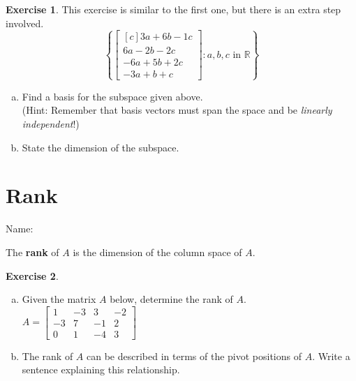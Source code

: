 \documentclass[10pt]{book}
\newcommand{\boxcolor}{gray!30}
\newenvironment{boxdef}{\begin{mdframed}[backgroundcolor=\boxcolor,linewidth=0pt,nobreak=true]}{\end{mdframed}}
\theoremstyle{definition}
\newtheorem{exercise}{Exercise}[section]
\newcommand{\name}[1][2.5in]{\vspace{-2.3em}\hfill Name: \underline{\hspace{#1}}}
\newcommand{\R}{\mathbb{R}}
\begin{document}
\begin{exercise} %
	This exercise is similar to the first one, but there is an extra step involved.
	$$\left\{ \begin{bmatrix}[c] 3a+6b-1c \\ 6a-2b-2c \\ -6a+5b+2c \\ -3a+b+c \end{bmatrix} : a,b,c \text{ in } \R \right\}$$
	\begin{enumerate}[(a)]
		\item Find a basis for the subspace given above. \\
		(Hint: Remember that basis vectors must span the space and be \emph{linearly independent}!)
		\vfill
		\item State the dimension of the subspace.
		\vspace{2em}
	\end{enumerate}
\end{exercise}


\newpage


\section{Rank}
\name

\begin{boxdef}
	The \textbf{rank} of $A$ is the dimension of the column space of $A$.
\end{boxdef}

\begin{exercise} %
	\begin{enumerate}[(a)]
		\item Given the matrix $A$ below, determine the rank of $A$.\\
		$ A = \begin{bmatrix} 1&-3&3&-2 \\ -3&7&-1&2 \\ 0&1&-4&3 \end{bmatrix} $
		\vfill
		\item The rank of $A$ can be described in terms of the pivot positions of $A$. Write a sentence explaining this relationship.
		\vspace{.75in}
	\end{enumerate}
\end{exercise}
\end{document}
